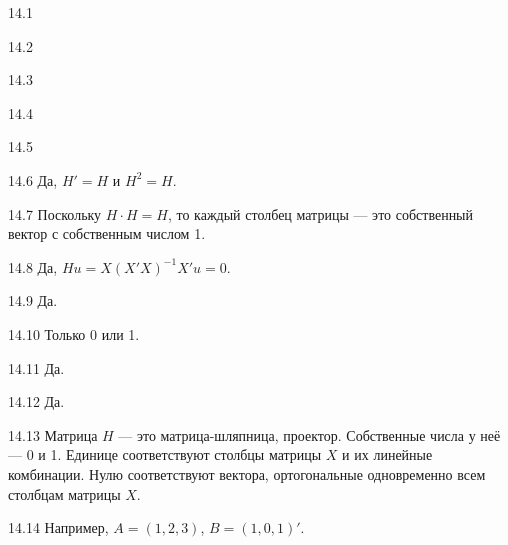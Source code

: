 \protect \hypertarget {soln:14.1}{}
\begin{solution}{{14.1}}
\end{solution}
\protect \hypertarget {soln:14.2}{}
\begin{solution}{{14.2}}
\end{solution}
\protect \hypertarget {soln:14.3}{}
\begin{solution}{{14.3}}
\end{solution}
\protect \hypertarget {soln:14.4}{}
\begin{solution}{{14.4}}
\end{solution}
\protect \hypertarget {soln:14.5}{}
\begin{solution}{{14.5}}
\end{solution}
\protect \hypertarget {soln:14.6}{}
\begin{solution}{{14.6}}
Да, $H'=H$ и $H^2=H$.
\end{solution}
\protect \hypertarget {soln:14.7}{}
\begin{solution}{{14.7}}
Поскольку $H\cdot H = H$, то каждый столбец матрицы — это собственный вектор с собственным числом 1.
\end{solution}
\protect \hypertarget {soln:14.8}{}
\begin{solution}{{14.8}}
Да, $Hu=X(X'X)^{-1}X'u=0$.
\end{solution}
\protect \hypertarget {soln:14.9}{}
\begin{solution}{{14.9}}
Да.
\end{solution}
\protect \hypertarget {soln:14.10}{}
\begin{solution}{{14.10}}
Только 0 или 1.
\end{solution}
\protect \hypertarget {soln:14.11}{}
\begin{solution}{{14.11}}
Да.
\end{solution}
\protect \hypertarget {soln:14.12}{}
\begin{solution}{{14.12}}
Да.
\end{solution}
\protect \hypertarget {soln:14.13}{}
\begin{solution}{{14.13}}
Матрица $H$ — это матрица-шляпница, проектор. Собственные числа у неё — 0 и 1. Единице соответствуют столбцы матрицы $X$ и их линейные комбинации. Нулю соответствуют вектора, ортогональные одновременно всем столбцам матрицы $X$.
\end{solution}
\protect \hypertarget {soln:14.14}{}
\begin{solution}{{14.14}}
Например, $A=(1,2,3)$, $B=(1,0, 1)'$.
\end{solution}
